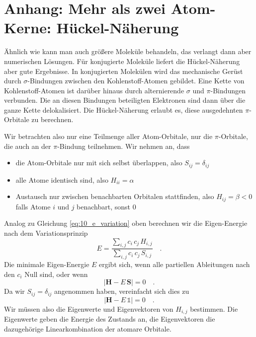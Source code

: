 \section{Anhang: Mehr als zwei Atom-Kerne: Hückel-Näherung}

Ähnlich wie   kann man auch größere Moleküle behandeln, das verlangt dann aber  numerischen Lösungen. Für konjugierte Moleküle liefert die Hückel-Näherung aber gute Ergebnisse. In konjugierten Molekülen wird das mechanische Gerüst durch $\sigma$-Bindungen zwischen den Kohlenstoff-Atomen gebildet. Eine Kette von Kohlenstoff-Atomen ist darüber hinaus durch alternierende $\sigma$ und $\pi$-Bindungen verbunden. Die an diesen Bindungen beteiligten Elektronen sind dann über die ganze Kette delokalisiert. Die Hückel-Näherung erlaubt es, diese ausgedehnten  $\pi$-Orbitale  zu berechnen.

Wir betrachten also nur eine Teilmenge aller Atom-Orbitale, nur die $\pi$-Orbitale, die auch an der $\pi$-Bindung teilnehmen. Wir nehmen an, dass
\begin{itemize} \setlength{\itemsep}{0pt}
\item die Atom-Orbitale nur mit sich selbst überlappen, also $S_{ij} = \delta_{ij}$
\item alle Atome identisch sind, also $H_{ii} = \alpha$
\item Austausch nur zwischen benachbarten Orbitalen stattfinden, also  $H_{ij} = \beta < 0 $ falls Atome $i$ und $j$ benachbart, sonst $0$ 
\end{itemize}

Analog zu Gleichung \ref{eq:10_e_variation} oben berechnen wir die Eigen-Energie nach dem Variationsprinzip
\begin{equation}
 E = \frac{  \sum_{i,j} c_i \, c_j \, H_{i,j} }{ \sum_{i,j} c_i \, c_j \, S_{i,j} } \quad .
\end{equation}
Die minimale Eigen-Energie $E$ ergibt sich, wenn alle partiellen Ableitungen nach den $c_i$ Null sind, oder wenn
\begin{equation}
 \left| \mathbf{H} - E \, \mathbf{S}\right| = 0 \quad .
\end{equation}
Da wir $S_{ij} = \delta_{ij}$ angenommen haben, vereinfacht sich dies zu 
\begin{equation}
 \left| \mathbf{H} - E \, \mathds{1} \right| = 0 \quad .
\end{equation}
Wir müssen also die Eigenwerte und Eigenvektoren von $H_{i,j}$ bestimmen. Die Eigenwerte geben die Energie des Zustands an, die Eigenvektoren die dazugehörige  Linearkombination der atomare Orbitale.

